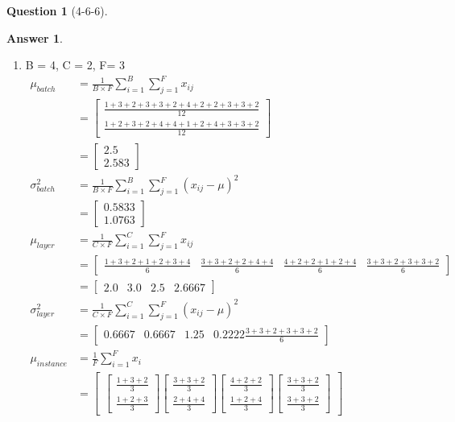 \documentclass[12pt]{article}
\theoremstyle{definition}
\newtheorem{exercise}{Question}%
\newtheorem{answer}{Answer} %
\newcommand{\Answer}[1]{
\begin{answer}#1\end{answer}
}
\begin{document}
\begin{exercise}[4-6-6]
\Answer{
\begin{enumerate}
    \item {
    B = 4, C = 2, F= 3
    \begin{align*}
    \mu_{batch} &= \frac{1}{B \times F} \sum_{i=1}^B \sum_{j=1}^F x_{ij}
    \\
    &= \begin{bmatrix}\frac{1 + 3 + 2 + 3 + 3 + 2 + 4 + 2 + 2 + 3 + 3 + 2}{12} \\ \frac{1 + 2 + 3 + 2 + 4 + 4 + 1 + 2 + 4 + 3 + 3 + 2}{12}\end{bmatrix}
    \\
    &= \begin{bmatrix} 2.5 \\ 2.583\end{bmatrix}
    \\
    \sigma^2_{batch} &= \frac{1}{B \times F} \sum_{i=1}^B \sum_{j=1}^F (x_{ij} - \mu)^2
    \\
    &= \begin{bmatrix}0.5833 \\ 1.0763 \end{bmatrix}
    \\
    \mu_{layer} &= \frac{1}{C \times F} \sum_{i=1}^C \sum_{j=1}^F x_{ij}
    \\
    &= \begin{bmatrix}\frac{1 + 3 + 2 + 1 + 2 + 3 + 4}{6} & \frac{3 + 3 + 2 + 2 + 4 + 4}{6} & \frac{4 + 2 + 2 + 1 + 2 + 4}{6} & \frac{3 + 3 + 2 + 3 + 3 + 2}{6}\end{bmatrix}
    \\
    &= \begin{bmatrix}2.0 & 3.0 & 2.5 & 2.6667\end{bmatrix}
    \\
    \sigma^2_{layer} &= \frac{1}{C \times F} \sum_{i=1}^C \sum_{j=1}^F (x_{ij} - \mu)^2
    \\
    &= \begin{bmatrix}0.6667 & 0.6667 & 1.25 & 0.2222 \frac{3 + 3 + 2 + 3 + 3 + 2}{6}\end{bmatrix}
    \\
    \mu_{instance} &= \frac{1}{F} \sum_{i=1}^F x_{i}
    \\
    &= \begin{bmatrix}\begin{bmatrix}\frac{1 + 3 + 2}{3} \\ \frac{1 + 2 + 3}{3} \end{bmatrix}\begin{bmatrix}\frac{3 + 3 + 2}{3} \\ \frac{2 + 4 + 4}{3} \end{bmatrix}\begin{bmatrix}\frac{4 + 2 + 2}{3} \\ \frac{1 + 2 + 4}{3} \end{bmatrix}\begin{bmatrix}\frac{3 + 3 + 2}{3} \\ \frac{3 + 3 + 2}{3} \end{bmatrix}\end{bmatrix}

\end{align*}}
\end{enumerate}}
\end{exercise}
\end{document}
